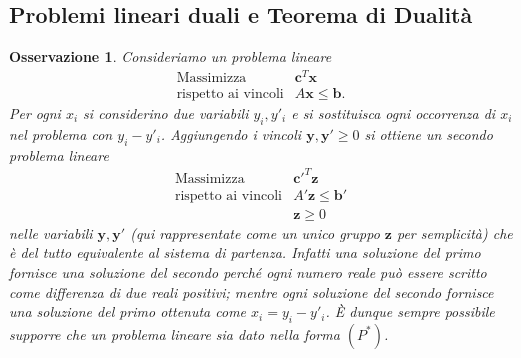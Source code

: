 \documentclass[italian, letter paper, 12pt, reqno]{article}
\theoremstyle{myteo}
\newtheorem{remark}[theorem]{Osservazione}
\numberwithin{equation}{section}
\begin{document}
\subsection{Problemi lineari duali e Teorema di Dualità}
\label{subsec:duali}
\begin{remark}
  \label{oss:forma_quasi_equazionale}
  Consideriamo un problema lineare
  \begin{equation*}
    \begin{array}{ll}
      \tag{\(P\)}
      \text{Massimizza} & \mathbf{c}^T\mathbf{x}\\
      \text{rispetto ai vincoli} & A\mathbf{x}\leq\mathbf{b}.
    \end{array}
  \end{equation*}
  Per ogni \(x_i\) si considerino due variabili \(y_i, y'_i\) e si sostituisca ogni occorrenza di \(x_i\) nel problema con \(y_i - y'_i\).
  Aggiungendo i vincoli \(\mathbf{y},\mathbf{y'}\geq0\) si ottiene un secondo problema lineare
  \begin{equation*}
    \begin{array}{ll}
      \tag{\(P^*\)}
      \text{Massimizza} & \mathbf{c'}^T\mathbf{z}\\
      \text{rispetto ai vincoli} & A'\mathbf{z}\leq\mathbf{b'}\\
                        & \mathbf{z}\geq0
    \end{array}
  \end{equation*}
  nelle variabili \(\mathbf{y}, \mathbf{y'}\) (qui rappresentate come un unico gruppo \(\mathbf{z}\) per semplicità) che è del tutto equivalente al sistema di partenza.
  Infatti una soluzione del primo fornisce una soluzione del secondo perché ogni numero reale può essere scritto come differenza di due reali positivi; mentre ogni soluzione del secondo fornisce una soluzione del primo ottenuta come \(x_i = y_i-y'_i\).
  È dunque sempre possibile supporre che un problema lineare sia dato nella forma \((P^*)\).
\end{remark}
\end{document}
